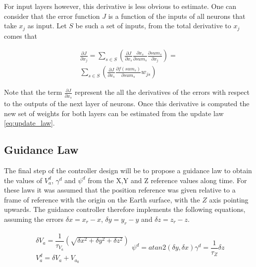 For input layers however, this derivative is less obvious to estimate. One can consider that the error function $J$ is a function of the inputs of all neurons that take $x_j$ as input. Let $S$ be such a set of inputs, from the total derivative to $x_j$ comes that

\begin{gather}
\frac{\partial J}{\partial x_j} = \sum _{s\in S}\left( \frac{\partial J}{\partial x_s}\frac{\partial x_s}{\partial sum_s}\frac{\partial sum_s}{\partial x_j}\right)=\\
\sum _{s\in S}\left( \frac{\partial J}{\partial x_s}\frac{\partial f(sum_s)}{\partial sum_s}w_{js}\right)
\end{gather}

Note that the term $ \frac{\partial J}{\partial x_s} $ represent the all the derivatives of the errors with respect to the outputs of the next layer of neurons. Once this derivative is computed the new set of weights for both layers can be estimated from the update law \ref{eq:update_law}.


\subsection{Guidance Law}

The final step of the controller design will be to propose a guidance law to obtain the values of $V_a^d$, $\gamma^d$ and $\psi^d$ from the X,Y and Z reference values along time. For these laws it was assumed that the position reference was given relative to a frame of reference with the origin on the Earth surface, with the $Z$ axis pointing upwards. The guidance controller therefore implements the following equations, assuming the errors $\delta x = x_r - x$, $\delta y = y_r - y$ and $\delta z = z_r-z$.

\begin{subequations}
	\begin{gather}
	\delta V_a = \dfrac{1}{\tau_{V_a}}(\sqrt{\delta x^2 + \delta y^2 + \delta z^2})\\
	V_a^d= \delta V_a  + V_{a_0}
	\end{gather}
	\begin{equation}
	\psi^d = atan2(\delta y,\delta x)
	\end{equation}
	\begin{equation}
	\gamma^d = \dfrac{1}{\tau_Z}\delta z
	\end{equation}
	\label{eq:guidance_law}
\end{subequations}

